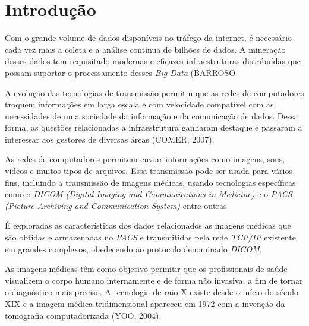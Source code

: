 \documentclass[
	12pt,				%
	openright,			%
	twoside,			%
	a4paper,			%
	english,			%
	french,				%
	spanish,			%
	brazil				%
	]{abntex2}
\begin{document}
\tableofcontents*
\cleardoublepage



\textual

\chapter{Introdução}

Com o grande volume de dados disponíveis no tráfego da internet, é necessário cada vez mais a coleta e a análise contínua de bilhões de dados. A mineração desses dados tem requisitado modernas e eficazes infraestruturas distribuídas que possam suportar o processamento desses \emph{Big Data} (BARROSO%

A evolução das tecnologias de transmissão permitiu que as redes de computadores troquem informações em larga escala e com velocidade compatível com as necessidades de uma sociedade da informação e da comunicação de dados. Dessa forma, as questões relacionadas a infraestrutura ganharam destaque e passaram a interessar aos gestores de diversas áreas (COMER, 2007).

As redes de computadores permitem enviar informações como imagens, sons, vídeos e muitos tipos de arquivos. Essa transmissão pode ser usada para vários fins, incluindo a transmissão de imagens médicas, usando tecnologias específicas como o \emph{DICOM (Digital Imaging and Communications in Medicine)} e o \emph{PACS (Picture Archiving and Communication System)} entre outras.

É exploradas as características dos dados relacionados as imagens médicas que são obtidas e armazenadas no \emph{PACS} e transmitidas pela rede \emph{TCP/IP} existente em grandes complexos, obedecendo ao protocolo denominado \emph{DICOM}.

As imagens médicas têm como objetivo permitir que os profissionais de saúde visualizem o corpo humano internamente e de forma não invasiva, a fim de tornar o diagnóstico mais preciso. A tecnologia de raio X existe desde o início do século XIX e a imagem médica 
tridimensional apareceu em 1972 com a invenção da tomografia computadorizada (YOO, 2004).
\end{document}
